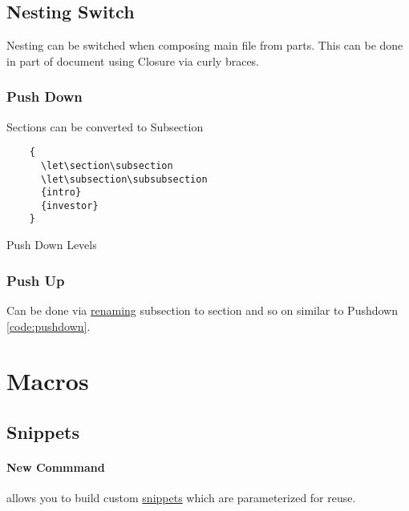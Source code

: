 \documentclass{report}[a4paper,12pt] %
\begin{document}
\subsection{Nesting Switch}
Nesting can be switched when composing main file from parts.
This can be done in part of document using Closure via curly braces.

\subsubsection{Push Down}
Sections can be converted to Subsection

\begin{listing}[h]
  \begin{verbatim}
    {
      \let\section\subsection
      \let\subsection\subsubsection
      {intro}
      {investor}
    }
  \end{verbatim}
  \caption{Push Down Levels}
  \label{code:pushdown}
\end{listing}

\subsubsection{Push Up}
Can be done via \href{https://tex.stackexchange.com/questions/291771/is-it-possible-to-input-a-file-while-lowering-every-section-it-has-by-1-level}{renaming} subsection to section and so on similar to Pushdown \ref{code:pushdown}.

\section{Macros}
\subsection{Snippets}
\paragraph{New Commmand} allows you to build custom \href{https://www.physicsread.com/latex-newcommand/}{snippets} which are parameterized for reuse.
\end{document}
